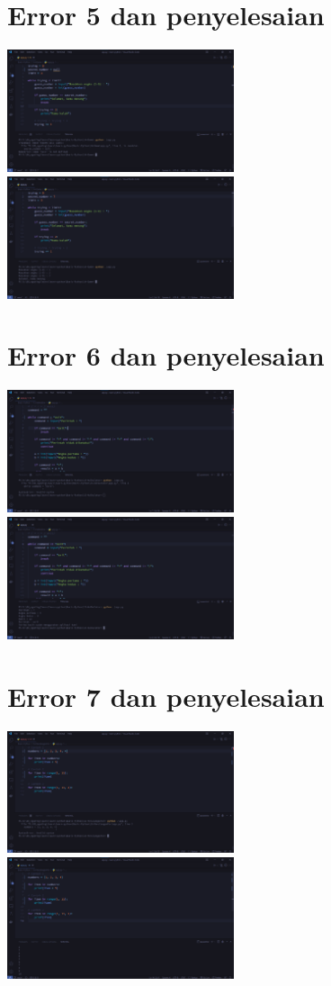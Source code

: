\documentclass{article}
\begin{document}
\section{Error 5 dan penyelesaian}
\includegraphics[width=0.5\textwidth]{gambar/14_error.png}
\includegraphics[width=0.5\textwidth]{gambar/14_penanganan.png}

\section{Error 6 dan penyelesaian}
\includegraphics[width=0.5\textwidth]{gambar/15_error.png}
\includegraphics[width=0.5\textwidth]{gambar/15_penanganan.png}

\section{Error 7 dan penyelesaian}
\includegraphics[width=0.5\textwidth]{gambar/16_error.png}
\includegraphics[width=0.5\textwidth]{gambar/16_pengananan.png}
\end{document}
